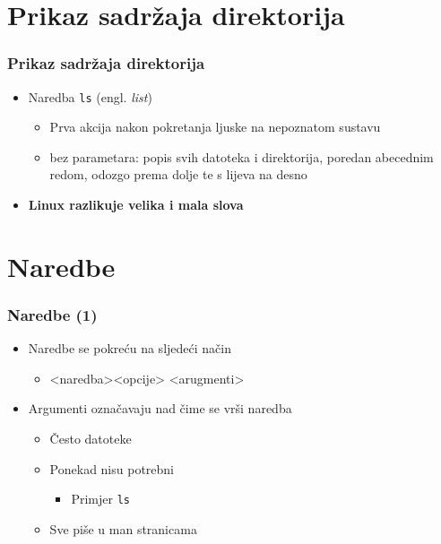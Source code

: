 \documentclass{beamer}
\begin{document}
\section{Prikaz sadržaja direktorija}
\begin{frame}[t]
\frametitle{Prikaz sadržaja direktorija}
\begin{itemize}
  \item Naredba \texttt {ls} (engl. \emph{list})
  \begin{itemize}
    \item Prva akcija nakon pokretanja ljuske na nepoznatom sustavu
    \item bez parametara: popis svih datoteka i direktorija, poredan
          abecednim redom, odozgo prema dolje te s lijeva na desno
  \end{itemize}
  \item \textbf {Linux razlikuje velika i mala slova}
\end{itemize}
\end{frame}

\section{Naredbe}
\begin{frame}[t]
\frametitle{Naredbe (1)}
\begin{itemize}
  \item Naredbe se pokreću na sljedeći način
  \begin{itemize}
    \item[] \textless naredba\textgreater \textless opcije\textgreater
          \textless arugmenti\textgreater
  \end{itemize}
  \item Argumenti označavaju nad čime se vrši naredba
  \begin{itemize}
    \item Često datoteke
    \item Ponekad nisu potrebni
    \begin{itemize}
      \item Primjer \texttt{ls}
    \end{itemize}
    \item Sve piše u man stranicama
  \end{itemize}
\end{itemize}
\end{frame}
\end{document}
